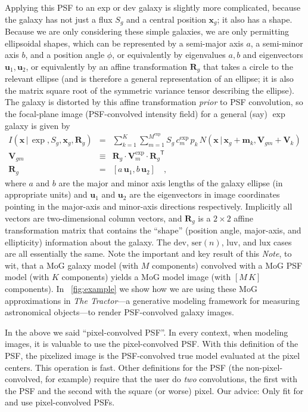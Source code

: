 \documentclass[12pt,pdftex,preprint]{aastex}
\newcommand{\documentname}{\textsl{Note}}
\newcommand{\project}[1]{\textsl{#1}}
\newcommand{\tmatrix}[1]{\boldsymbol{#1}}
\newcommand{\transpose}[1]{{#1}^{\mathsf T}}
\newcommand{\tvector}[1]{\boldsymbol{#1}}
\newcommand{\pos}{\tvector{x}}
\newcommand{\mean}{\tvector{m}}
\newcommand{\var}{\tmatrix{V}}
\newcommand{\affine}{\tmatrix{R}}
\newcommand{\uv}{\tvector{u}}
\newcommand{\normal}{N}
\newcommand{\given}{\,|\,}
\newcommand{\dev}{\mathrm{dev}}
\newcommand{\ser}{\mathrm{ser}}
\newcommand{\lux}{\mathrm{lux}}
\newcommand{\luv}{\mathrm{luv}}
\begin{document}
Applying this PSF to an exp or dev galaxy is slightly more
complicated, because the galaxy has not just a flux $S_g$ and a
central position $\pos_g$; it also has a shape.  Because we are only
considering these simple galaxies, we are only permitting ellipsoidal
shapes, which can be represented by a semi-major axis $a$, a
semi-minor axis $b$, and a position angle $\phi$, or equivalently by
eigenvalues $a, b$ and eigenvectors $\uv_1, \uv_2$, or equivalently by
an affine transformation $\affine_g$ that takes a circle to the
relevant ellipse (and is therefore a general representation of an
ellipse; it is also the matrix square root of the symmetric variance
tensor describing the ellipse).  The galaxy is distorted by this
affine transformation \emph{prior} to PSF convolution, so the
focal-plane image (PSF-convolved intensity field) for a general (say)
$\exp$ galaxy is given by
\begin{eqnarray}\displaystyle
I(\pos\given\exp,S_g,\pos_g,\affine_g) &=& \sum_{k=1}^K \sum_{m=1}^{M^{\exp}} S_g\,c^{\exp}_m\,p_k\,\normal(\pos\given\pos_g+\mean_k,\var_{gm}+\var_k)
\\
\var_{gm} &\equiv& \affine_g\cdot\var^{\exp}_m\cdot\transpose{\affine_g}
\\
\affine_g &=& \left[a\,\uv_1 , b\,\uv_2 \right]
\quad ,
\end{eqnarray}
where $a$ and $b$ are the major and minor axis lengths of the galaxy
ellipse (in appropriate units) and $\uv_1$ and $\uv_2$ are the
eigenvectors in image coordinates pointing in the major-axis and
minor-axis directions respectively.  Implicitly all vectors are
two-dimensional column vectors, and $\affine_g$ is a $2\times 2$
affine transformation matrix that contains the ``shape'' (position
angle, major-axis, and ellipticity) information about the galaxy.  The
$\dev$, $\ser(n)$, $\luv$, and $\lux$ cases are all essentially the
same.  Note the important and key result of this \documentname, to
wit, that a MoG galaxy model (with $M$ components) convolved with a
MoG PSF model (with $K$ components) yields a MoG model image (with
$[M\,K]$ components).  In \figurename~\ref{fig:example} we show how we
are using these MoG approximations in \project{The Tractor}---a
generative modeling framework for measuring astronomical objects---to
render PSF-convolved galaxy images.

In the above we said ``pixel-convolved PSF''.  In every context, when
modeling images, it is valuable to use the pixel-convolved PSF.  With
this definition of the PSF, the pixelized image is the PSF-convolved
true model evaluated at the pixel centers.  This operation is fast.
Other definitions for the PSF (the non-pixel-convolved, for example)
require that the user do \emph{two} convolutions, the first with the
PSF and the second with the square (or worse) pixel.  Our advice: Only
fit for and use pixel-convolved PSFs.
\end{document}

